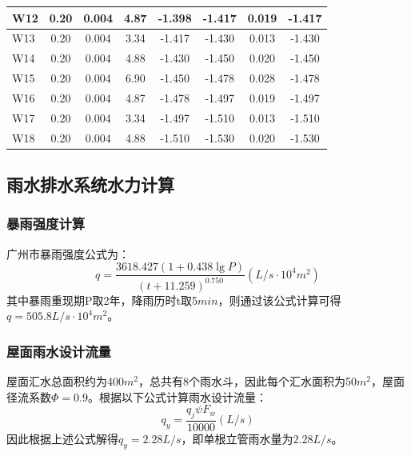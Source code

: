 \documentclass{gdutart}
\begin{document}
\begin{center}
\begin{xltabular}{\textwidth}{|Y|c|c|c|c|c|c|c|}
            \hline
            W12   & 0.20  & 0.004  & 4.87  & -1.398  & -1.417  & 0.019  & -1.417  \bigstrut\\
            \hline
            W13   & 0.20  & 0.004  & 3.34  & -1.417  & -1.430  & 0.013  & -1.430  \bigstrut\\
            \hline
            W14   & 0.20  & 0.004  & 4.88  & -1.430  & -1.450  & 0.020  & -1.450  \bigstrut\\
            \hline
            W15   & 0.20  & 0.004  & 6.90  & -1.450  & -1.478  & 0.028  & -1.478  \bigstrut\\
            \hline
            W16   & 0.20  & 0.004  & 4.87  & -1.478  & -1.497  & 0.019  & -1.497  \bigstrut\\
            \hline
            W17   & 0.20  & 0.004  & 3.34  & -1.497  & -1.510  & 0.013  & -1.510  \bigstrut\\
            \hline
            W18   & 0.20  & 0.004  & 4.88  & -1.510  & -1.530  & 0.020  & -1.530  \bigstrut\\
            \hline
          \end{xltabular}
        \end{center} \newpage

    \subsection{雨水排水系统水力计算}
      \subsubsection{暴雨强度计算}
        广州市暴雨强度公式为：
        \begin{equation}
          q = \frac{{3618.427(1 + 0.438\lg P)}}{{{{(t + 11.259)}^{0.750}}}}(L/s \cdot {10^4}{m^2})
        \end{equation}
        其中暴雨重现期P取2年，降雨历时t取5$min$，则通过该公式计算可得$q = 505.8L/s \cdot {10^4}{m^2}$。

      \subsubsection{屋面雨水设计流量}
        屋面汇水总面积约为400$m^2$，总共有8个雨水斗，因此每个汇水面积为50$m^2$，屋面径流系数$\Phi = 0.9$。根据以下公式计算雨水设计流量：
        \begin{equation}
          {q_y} = \frac{{{q_j}\psi {F_w}}}{{10000}}(L/s)
        \end{equation}
        因此根据上述公式解得$q_y = 2.28L/s$，即单根立管雨水量为$2.28L/s$。
\end{document}
